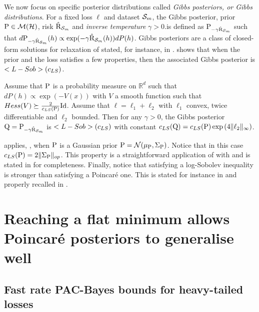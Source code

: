 We now focus on specific posterior distributions called \emph{Gibbs posteriors, or Gibbs distributions}.
For a fixed loss $\ell$ and dataset $\S_m$, the Gibbs posterior, \wrt prior $\P\in\Mcal(\Hcal)$, risk $\hat{\Risk}_{\S_m}$ and \emph{inverse temperature} $\gamma>0$.is defined as $\P_{-\gamma \hat{\Risk}_{\S_m}}$ such that  $d\P_{-\gamma \hat{\Risk}_{\S_m}}(h)\propto \exp( - \gamma \hat{\Risk}_{\S_m}(h) ) dP(h)$. 
Gibbs posteriors are a class of closed-form solutions for relaxation of \citet[Theorem 1.2.6]{catoni2007pac} stated, for instance, in \citet[Theorem 4.1]{alquier2016properties}. 
 shows that when the prior and the loss satisfies a few properties, then the associated Gibbs posterior is $\Lsob(c_{LS})$.

\begin{proposition}\label{prop:gibbs_logsob}
Assume that $\P$ is a probability measure on $\mathbb{R}^d$ such that $dP(h) \propto \exp(-V(x))$ with $V$ a smooth function such that $Hess(V)\succeq \frac{2}{c_{LS}(\P)}\mathrm{Id}$.
Assume that $\ell= \ell_1 + \ell_2$ with $\ell_1$ convex, twice differentiable and $\ell_2$ bounded. 
Then for any $\gamma>0$, the Gibbs posterior $\Q= \P_{-\gamma\hat{\Risk}_{\S_m}}$ is $\Lsob(c_{LS})$ with constant $c_{LS}(\Q)= c_{LS}(\P)\exp\LP 4\|\ell_2\|_{\infty}\RP $.
\end{proposition}
 applies, \eg, when $\P$ is a Gaussian prior $\P=\Ncal(\mu_\P,\Sigma_\P)$. Notice that in this case $c_{LS}(\P)= 2\|\Sigma_\P\|_{op}$. This property is a straightforward application of \citet[Corollary 2.1]{chafai2004entropies} with \citet[Property 2.6]{guionnet2003lectures} and is stated in  for completeness.
Finally, notice that satisfying a log-Sobolev inequality is stronger than satisfying a Poincaré one. This is stated for instance in \citet[Proposition 2.1]{ledoux2006concentration} and properly recalled in . 

\section{Reaching a flat minimum allows Poincaré posteriors to generalise well}
\label{sec:poincare_gauss}

\subsection{Fast rate PAC-Bayes bounds for heavy-tailed losses}  
\label{sec:fast_rates_gradient_h}

